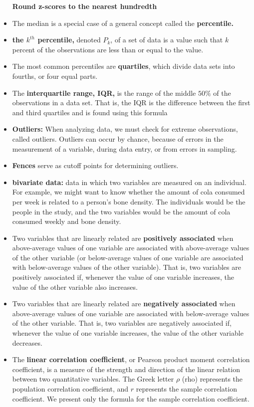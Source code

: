 \documentclass{report}
\begin{document}
\begin{itemize}
                 \textbf{Round z-scores to the nearest hundredth}
             \item  The median is a special case of a general concept called the \textbf{percentile.}
             \item \textbf{the $k^{th}$  percentile,} denoted $P_{k} $,  of a set of data is a value such that $k $  percent of the observations are less than or equal to the value.
                \item The most common percentiles are \textbf{quartiles}, which divide data sets into fourths, or four equal parts.
                \item The \textbf{interquartile range, IQR,} is the range of the middle $50\% $  of the observations in a data set. That is, the IQR is the difference between the first and third quartiles and is found using this formula  
               \item \textbf{Outliers:} When analyzing data, we must check for extreme observations, called outliers. Outliers can occur by chance, because of errors in the measurement of a variable, during data entry, or from errors in sampling.
                \item \textbf{Fences} serve as cutoff points for determining outliers.
        \item \textbf{bivariate data:} data in which two variables are measured on an individual. For example, we might want to know whether the amount of cola consumed per week is related to a person's bone density. The individuals would be the people in the study, and the two variables would be the amount of cola consumed weekly and bone density.
        \item Two variables that are linearly related are \textbf{positively associated} when above-average values of one variable are associated with above-average values of the other variable (or below-average values of one variable are associated with below-average values of the other variable). That is, two variables are positively associated if, whenever the value of one variable increases, the value of the other variable also increases.
        \item Two variables that are linearly related are \textbf{negatively associated} when above-average values of one variable are associated with below-average values of the other variable. That is, two variables are negatively associated if, whenever the value of one variable increases, the value of the other variable decreases.
        \item The \textbf{linear correlation coefficient}, or Pearson product moment correlation coefficient, is a measure of the strength and direction of the linear relation between two quantitative variables. The Greek letter $\rho $ (rho) represents the population correlation coefficient, and $r $ represents the sample correlation coefficient. We present only the formula for the sample correlation coefficient.

\end{itemize}
\end{document}
